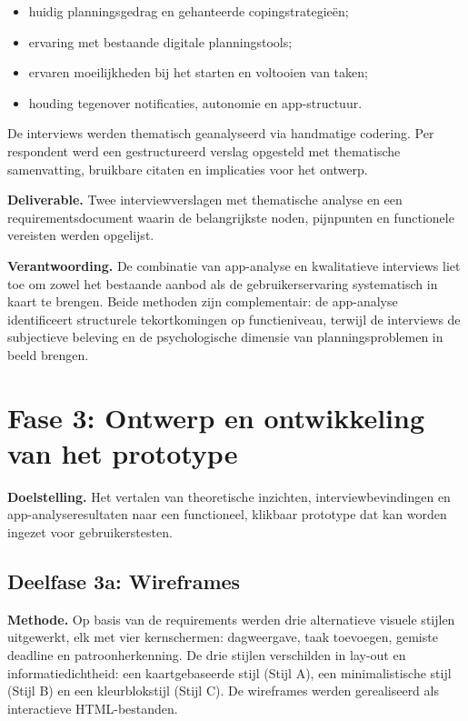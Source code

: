 \begin{itemize}
  \item huidig planningsgedrag en gehanteerde copingstrategieën;
  \item ervaring met bestaande digitale planningstools;
  \item ervaren moeilijkheden bij het starten en voltooien van taken;
  \item houding tegenover notificaties, autonomie en app-structuur.
\end{itemize}

De interviews werden thematisch geanalyseerd via handmatige codering. Per
respondent werd een gestructureerd verslag opgesteld met thematische samenvatting,
bruikbare citaten en implicaties voor het ontwerp.

\textbf{Deliverable.}
Twee interviewverslagen met thematische analyse en een requirementsdocument
waarin de belangrijkste noden, pijnpunten en functionele vereisten werden
opgelijst.

\textbf{Verantwoording.}
De combinatie van app-analyse en kwalitatieve interviews liet toe om zowel het
bestaande aanbod als de gebruikerservaring systematisch in kaart te brengen.
Beide methoden zijn complementair: de app-analyse identificeert structurele
tekortkomingen op functieniveau, terwijl de interviews de subjectieve beleving
en de psychologische dimensie van planningsproblemen in beeld brengen.

\section{Fase 3: Ontwerp en ontwikkeling van het prototype}

\textbf{Doelstelling.}
Het vertalen van theoretische inzichten, interviewbevindingen en app-analyseresultaten
naar een functioneel, klikbaar prototype dat kan worden ingezet voor
gebruikerstesten.

\subsection{Deelfase 3a: Wireframes}

\textbf{Methode.}
Op basis van de requirements werden drie alternatieve visuele stijlen uitgewerkt,
elk met vier kernschermen: dagweergave, taak toevoegen, gemiste deadline en
patroonherkenning. De drie stijlen verschilden in lay-out en informatiedichtheid:
een kaartgebaseerde stijl (Stijl A), een minimalistische stijl (Stijl B) en een
kleurblokstijl (Stijl C). De wireframes werden gerealiseerd als interactieve
HTML-bestanden.

